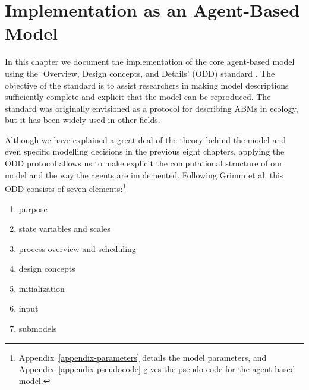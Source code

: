 \chapter{Implementation as an Agent-Based Model} \label{chapter-agent-implementation}

In this chapter we document the implementation of the core agent-based model using the `Overview, Design concepts, and Details' (ODD) standard \cite{grimmODDProtocolReview2010a}. The objective of the standard is to assist researchers in making model descriptions sufficiently complete and explicit that the model can be reproduced. The standard was originally envisioned as a protocol for describing ABMs in ecology, but it has been widely used in other fields.

Although we have explained a great deal of the theory behind the model and even specific modelling decisions in the previous eight chapters, applying the ODD protocol allows us to make explicit the computational structure of our model and the way the agents are implemented. Following Grimm et al. \cite{grimmODDProtocolDescribing2020} this ODD consists of seven elements:\footnote{Appendix~\ref{appendix-parameters} details the model parameters, and Appendix~\ref{appendix-pseudocode} gives the pseudo code for the agent based model.} %

\begin{enumerate}
    \item purpose
    \item state variables and scales
    \item process overview and scheduling 
    \item design concepts
    \item initialization
    \item input
    \item submodels 
\end{enumerate}




